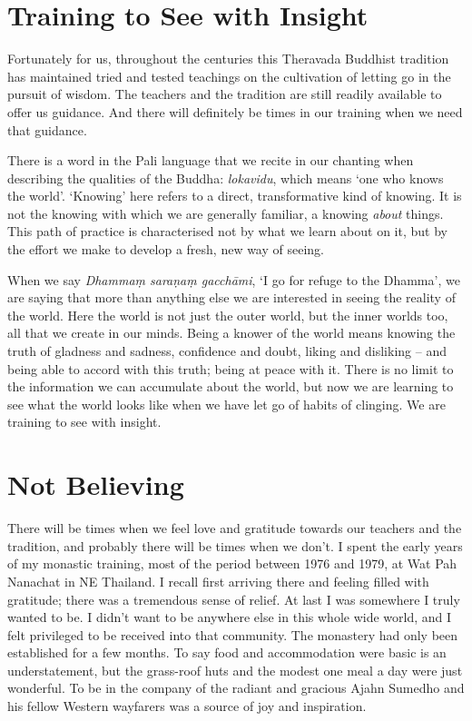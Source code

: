 \section{Training to See with Insight}

Fortunately for us, throughout the centuries this Theravada Buddhist
tradition has maintained tried and tested teachings on the cultivation
of letting go in the pursuit of wisdom. The teachers and the tradition
are still readily available to offer us guidance. And there will
definitely be times in our training when we need that guidance.

There is a word in the Pali language that we recite in our chanting when
describing the qualities of the Buddha: \emph{lokavidu}, which means ‘one who
knows the world’. ‘Knowing’ here refers to a direct, transformative kind
of knowing. It is not the knowing with which we are generally familiar,
a knowing \emph{about} things. This path of practice is characterised not by
what we learn about on it, but by the effort we make to develop a fresh,
new way of seeing.

When we say \emph{Dhammaṃ saraṇaṃ gacchāmi}, ‘I go for refuge to the Dhamma’,
we are saying that more than anything else we are interested in seeing
the reality of the world. Here the world is not just the outer world,
but the inner worlds too, all that we create in our minds. Being a
knower of the world means knowing the truth of gladness and sadness,
confidence and doubt, liking and disliking – and being able to accord
with this truth; being at peace with it. There is no limit to the
information we can accumulate about the world, but now we are learning
to see what the world looks like when we have let go of habits of
clinging. We are training to see with insight.

\section{Not Believing}

There will be times when we feel love and gratitude towards our teachers
and the tradition, and probably there will be times when we don’t. I
spent the early years of my monastic training, most of the period
between 1976 and 1979, at Wat Pah Nanachat in NE Thailand. I recall
first arriving there and feeling filled with gratitude; there was a
tremendous sense of relief. At last I was somewhere I truly wanted to
be. I didn’t want to be anywhere else in this whole wide world, and I
felt privileged to be received into that community. The monastery had
only been established for a few months. To say food and accommodation
were basic is an understatement, but the grass-roof huts and the modest
one meal a day were just wonderful. To be in the company of the radiant
and gracious Ajahn Sumedho and his fellow Western wayfarers was a source
of joy and inspiration.

